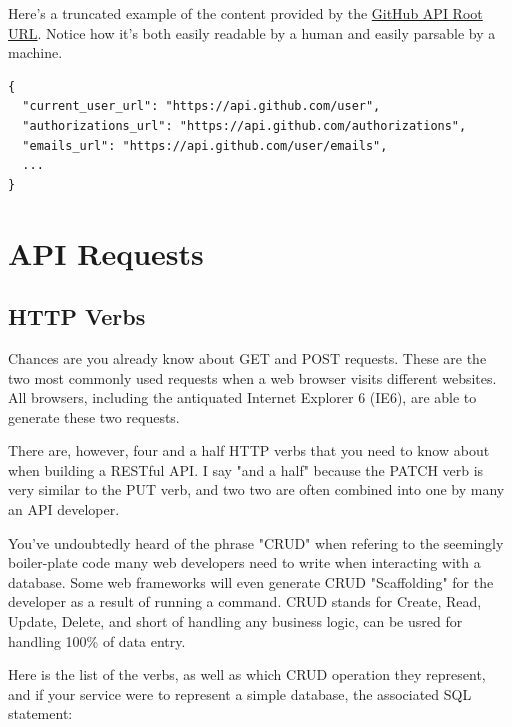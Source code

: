 \documentclass{book}
\begin{document}
Here's a truncated example of the content provided by the \href{https://api.github.com/}{GitHub API Root URL}. Notice how it's both easily readable by a human and easily parsable by a machine.

\begin{verbatim}
{
  "current_user_url": "https://api.github.com/user",
  "authorizations_url": "https://api.github.com/authorizations",
  "emails_url": "https://api.github.com/user/emails",
  ...
}
\end{verbatim}


\chapter{API Requests}

\section{HTTP Verbs}

Chances are you already know about GET and POST requests. These are the two most commonly used requests when a web browser visits different websites. All browsers, including the antiquated Internet Explorer 6 (IE6), are able to generate these two requests.

There are, however, four and a half HTTP verbs that you need to know about when building a RESTful API. I say "and a half" because the PATCH verb is very similar to the PUT verb, and two two are often combined into one by many an API developer.

You've undoubtedly heard of the phrase "CRUD" when refering to the seemingly boiler-plate code many web developers need to write when interacting with a database. Some web frameworks will even generate CRUD "Scaffolding" for the developer as a result of running a command. CRUD stands for Create, Read, Update, Delete, and short of handling any business logic, can be usred for handling 100\% of data entry.

Here is the list of the verbs, as well as which CRUD operation they represent, and if your service were to represent a simple database, the associated SQL statement:
\end{document}
